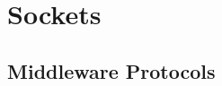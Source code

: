 \section{Sockets}\label{sec:Sockets}





\subsection{Middleware Protocols}\label{subsubsec:Middleware_Protocols}

